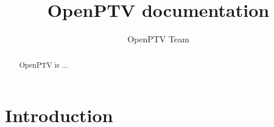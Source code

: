 \documentclass{report}
\begin{document}
\author{OpenPTV Team}
\title{OpenPTV documentation}
\pagestyle{empty}
\maketitle
\thispagestyle{empty}

\pagestyle{fancy}

\begin{abstract}
OpenPTV is ...

\begin{figure}[!ht]
\end{figure}
\end{abstract}

\tableofcontents
\listoffigures
\newpage

\chapter{Introduction}





\appendix

\end{document}
